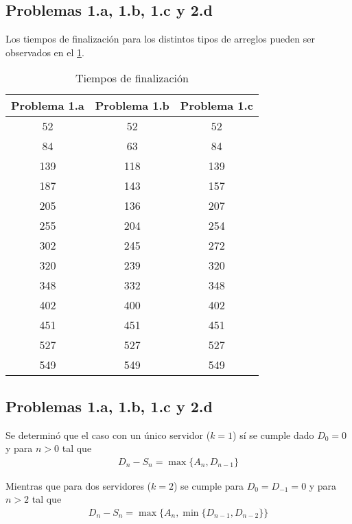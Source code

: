\documentclass[journal]{IEEEtran}
\begin{document}
\subsection{Problemas 1.a, 1.b, 1.c y 2.d}
Los tiempos de finalización para los distintos tipos de arreglos pueden ser observados en el \cref{tab:tiemposFIN}.
\begin{table}
	\centering
	\caption{Tiempos de finalización}
	\label{tab:tiemposFIN}
	\begin{tabular}{ccc}
		\hline
		Problema 1.a & Problema 1.b & Problema 1.c \\ \hline
		52           & 52           & 52           \\
		84           & 63           & 84           \\
		139          & 118          & 139          \\
		187          & 143          & 157          \\
		205          & 136          & 207          \\
		255          & 204          & 254          \\
		302          & 245          & 272          \\
		320          & 239          & 320          \\
		348          & 332          & 348          \\
		402          & 400          & 402          \\
		451          & 451          & 451          \\
		527          & 527          & 527          \\
		549          & 549          & 549          \\ \hline
	\end{tabular}
\end{table}

\subsection{Problemas 1.a, 1.b, 1.c y 2.d}

Se determinó que el caso con un único servidor ($k=1$) sí se cumple dado $D_0=0$ y para $n>0$ tal que 
\begin{align}
	D_n-S_n =\max\{A_n,D_{n-1}\}
\end{align}

Mientras que para dos servidores ($k=2$) se cumple para $D_0=D_{-1}=0$ y para $n>2$ tal que 
\begin{align}
	D_n-S_n=\max\{A_n,\min\{D_{n-1},D_{n-2}\}\}
\end{align}
\end{document}
